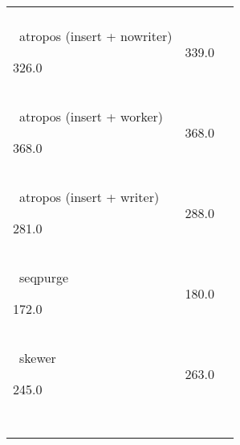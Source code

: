 \begin{table}[ht]
\begin{tabular}{lr|r}
{        \\\    
        atropos (insert + nowriter)
        
        326.0
        & 339.0
        
        \\\    
        atropos (insert + worker)
        
        368.0
        & 368.0
        
        \\\    
        atropos (insert + writer)
        
        281.0
        & 288.0
        
        \\\    
        seqpurge
        
        172.0
        & 180.0
        
        \\\    
        skewer
        
        245.0
        & 263.0
        
        \\\    
\end{tabular}
\caption{\label{tab:table}}
\end{table}

